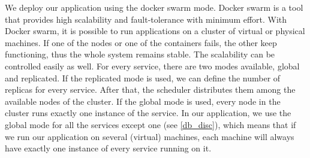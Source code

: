 We deploy our application using the docker swarm mode. Docker swarm is a tool that provides high scalability and fault-tolerance with minimum effort. With Docker swarm, it is possible to run applications on a cluster of virtual or physical machines. If one of the nodes or one of the containers fails, the other keep functioning, thus the whole system remains stable. The scalability can be controlled easily as well. For every service, there are two modes available, global and replicated. If  the replicated mode is used, we can define the number of replicas for every service. After that, the scheduler distributes them among the available nodes of the cluster. If the global mode is used, every node in the cluster runs exactly one instance of the service. In our application, we use the global mode for all the services except one (see \ref{db_disc}), which means that if we run our application on several (virtual) machines, each machine will always have exactly one instance of every service running on it.
